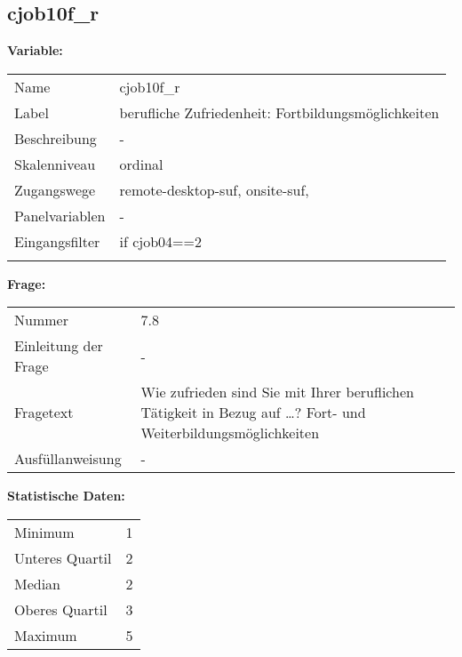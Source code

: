 	
	
	\subsection{cjob10f\_r}
	\label{subSection:cjob10f_r}

	\noindent\textbf{Variable:}\\
		\begin{tabular}{lL{11.3cm}}
			\label{tableVariable:cjob10f_r}
			Name & cjob10f\_r \\
			Label & berufliche Zufriedenheit: Fortbildungsmöglichkeiten \\
			Beschreibung & - \\
			Skalenniveau & ordinal \\
			Zugangswege &
				remote-desktop-suf,
				onsite-suf,
 \\
			Panelvariablen & -
			 \\
			Eingangsfilter & if cjob04==2 \\
 \\
		\end{tabular}

		\vspace*{1 cm}
		\noindent\textbf{Frage:}\\
		\begin{tabular}{lL{11.3cm}}
			\label{tableQuestion:cjob10f_r}
			Nummer & 7.8 \\
			Einleitung der Frage & - \\
			Fragetext & Wie zufrieden sind Sie mit Ihrer beruflichen Tätigkeit in Bezug auf …?
Fort- und Weiterbildungsmöglichkeiten \\
			Ausfüllanweisung & - \\
		\end{tabular}


		\vspace*{1 cm}
		\noindent\textbf{Statistische Daten:}\\
			\begin{tabular}{ll}
				\label{tableStatistics:cjob10f_r}
					Minimum & 1 \\
					Unteres Quartil & 2 \\
					Median & 2 \\
					Oberes Quartil & 3 \\
					Maximum & 5 \\
			\end{tabular}



